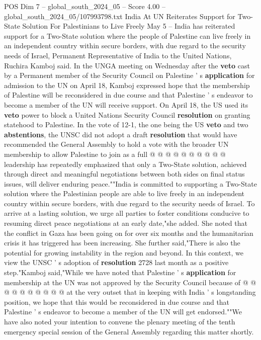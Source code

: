 \begin{textsample}{POS Dim 7 – global\_south\_2024\_05 – Score 4.00 – global\_south\_2024\_05/107993798.txt}  \label{ex:f7_pos_062}
India At UN Reiterates Support for Two-State Solution For Palestinians to Live Freely May 5 -- India has reiterated support for a Two-State solution where the people of Palestine can live freely in an independent country within secure borders, with due regard to the security needs of Israel, Permanent Representative of India to the United Nations, Ruchira Kamboj said.
In the UNGA meeting on Wednesday after the \textbf{veto} cast by a Permanent member of the Security Council on Palestine ' s \textbf{application} for admission to the UN on April 18, Kamboj expressed hope that the membership of Palestine will be reconsidered in due course and that Palestine ' s endeavor to become a member of the UN will receive support.
On April 18, the US used its \textbf{veto} power to block a United Nations Security Council \textbf{resolution} on granting statehood to Palestine.
In the vote of 12-1, the one being the US \textbf{veto} and two \textbf{abstentions}, the UNSC did not adopt a draft \textbf{resolution} that would have recommended the General Assembly to hold a vote with the broader UN membership to allow Palestine to join as a full @ @ @ @ @ @ @ @ @ @ leadership has repeatedly emphasized that only a Two-State solution, achieved through direct and meaningful negotiations between both sides on final status issues, will deliver enduring peace.""India is committed to supporting a Two-State solution where the Palestinian people are able to live freely in an independent country within secure borders, with due regard to the security needs of Israel.
To arrive at a lasting solution, we urge all parties to foster conditions conducive to resuming direct peace negotiations at an early date,"she added.
She noted that the conflict in Gaza has been going on for over six months and the humanitarian crisis it has triggered has been increasing.
She further said,"There is also the potential for growing instability in the region and beyond.
In this context, we view the UNSC ' s adoption of \textbf{resolution} 2728 last month as a positive step."Kamboj said,"While we have noted that Palestine ' s \textbf{application} for membership at the UN was not approved by the Security Council because of @ @ @ @ @ @ @ @ @ @ at the very outset that in keeping with India ' s longstanding position, we hope that this would be reconsidered in due course and that Palestine ' s endeavor to become a member of the UN will get endorsed.""We have also noted your intention to convene the plenary meeting of the tenth emergency special session of the General Assembly regarding this matter shortly.

\end{textsample}
